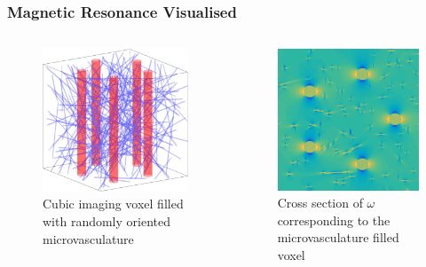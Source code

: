 \begin{frame}
\frametitle{Magnetic Resonance Visualised}
\centering
\begin{columns}
\begin{column}{.5\textwidth}
\begin{figure}
  \includegraphics[height=0.8\textwidth]{figures/voxelgeo}
  \caption{Cubic imaging voxel filled with randomly oriented microvasculature}
\end{figure}
\end{column}
\begin{column}{.5\textwidth}
\begin{figure}
  \includegraphics[height=0.8\textwidth]{figures/domega}
  \caption{Cross section of $\omega$ corresponding to the microvasculature filled voxel}
\end{figure}
\end{column}
\end{columns}
\end{frame}

